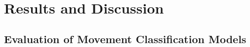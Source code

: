 %
% 
%
\chapter{Results and Discussion}
    \section{Evaluation of Movement Classification Models}
                 
                
                
